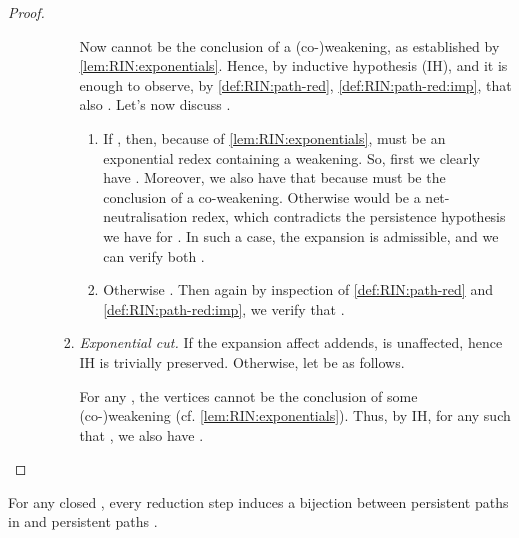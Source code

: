 \begin{proof}
\begin{itemize}
\begin{enumerate}
\begin{enumerate}
      Now  cannot be the conclusion of a (co-)weakening,
      as established by \autoref{lem:RIN:exponentials}.
      Hence, by inductive hypothesis (IH),  and it is enough to 
      observe, by \autoref{def:RIN:path-red}, \autoref{def:RIN:path-red:imp},
      that also .
      Let's now discuss .
      \begin{enumerate}
      \item If , then,
        because of \autoref{lem:RIN:exponentials}, 
         must be an exponential redex containing a weakening.
        So, first we clearly have .
        Moreover, we also have that  because 
         must be the conclusion of a co-weakening.
        Otherwise  would be a net-neutralisation redex,
        which contradicts the persistence hypothesis we have for .
        In such a case, the expansion is admissible, and we can verify both
        .
      \item Otherwise .
        Then again by inspection of
        \autoref{def:RIN:path-red} and \ref{def:RIN:path-red:imp},
        we verify that .
      \end{enumerate}
    \item \textit{Exponential cut.}
      If the expansion affect  addends,
       is unaffected, hence IH is trivially preserved.
      Otherwise, let  be as follows.
      
      For any ,
      the vertices  cannot be the conclusion 
      of some (co-)weakening (cf. \autoref{lem:RIN:exponentials}).
      Thus, by IH, for any  such that
      , we also have
      .
    \end{enumerate}
  \end{enumerate}
\end{itemize}
\vspace{-1.5em}
\end{proof}

\begin{theorem}
\label{thm:RIN:path-red:bij}
For any closed , every reduction step  induces a 
bijection between persistent paths in  and persistent paths 
.
\end{theorem}



